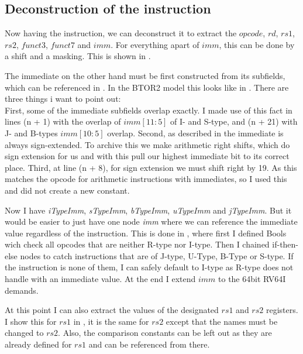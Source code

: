 \subsection{Deconstruction of the instruction}
Now having the instruction, we can deconstruct it to extract the $opcode$,
$rd$, $rs1$, $rs2$, $funct3$, $funct7$ and $imm$. For everything apart of
$imm$, this can be done by a shift and a masking. This is shown in
.

The immediate on the other hand must be first constructed from its subfields,
which can be referenced in . In the BTOR2 model this
looks like in .  There are three things i want to point out:\\ First, some of the
immediate subfields overlap exactly. I made use of this fact in lines (n + 1)
with the overlap of $imm[11:5]$ of I- and S-type, and (n + 21) with J- and
B-types $imm[10:5]$ overlap. Second, as described in  the
immediate is always sign-extended. To archive this we make arithmetic right
shifts, which do sign extension for us and with this pull our highest immediate
bit to its correct place. Third, at line (n + 8), for sign extension we must
shift right by 19. As this matches the opcode for arithmetic instructions with
immediates, so I used this and did not create a new constant.

Now I have \textsl{iTypeImm}, \textsl{sTypeImm}, \textsl{bTypeImm},
\textsl{uTypeImm} and \textsl{jTypeImm}. But it would be easier to just have
one node \textsl{imm} where we can reference the immediate value regardless of
the instruction. This is done in , where first I defined
Bools wich check all opcodes that are neither R-type nor I-type. Then I chained
if-then-else nodes to catch instructions that are of J-type, U-Type, B-Type or
S-type. If the instruction is none of them, I can safely default to I-type as
R-type does not handle with an immediate value. At the end I extend $imm$ to
the 64bit RV64I demands.

At this point I can also extract the values of the designated $rs1$ and $rs2$
registers. I show this for $rs1$ in , it is the same
for $rs2$ except that the names must be changed to $rs2$. Also, the comparison
constants can be left out as they are already defined for $rs1$ and can be
referenced from there.






